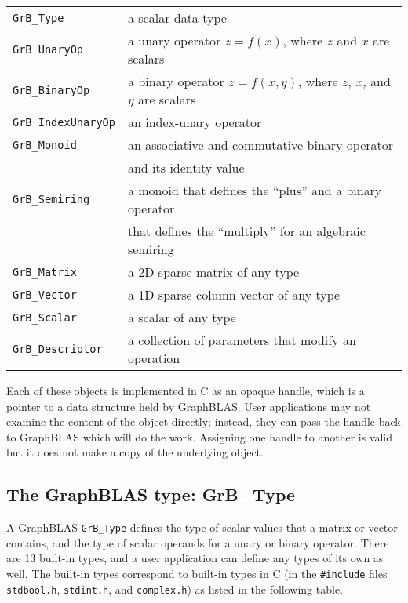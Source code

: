 \documentclass[12pt]{article}
\begin{document}
\vspace{0.1in}
\noindent
{\small
\begin{tabular}{ll}
\hline
\verb'GrB_Type'      & a scalar data type \\
\verb'GrB_UnaryOp'   & a unary operator $z=f(x)$, where $z$ and $x$ are scalars\\
\verb'GrB_BinaryOp'  & a binary operator $z=f(x,y)$, where $z$, $x$, and $y$ are scalars\\
\verb'GrB_IndexUnaryOp'  & an index-unary operator \\
\verb'GrB_Monoid'    & an associative and commutative binary operator  \\
                     & and its identity value \\
\verb'GrB_Semiring'  & a monoid that defines the ``plus'' and a binary operator\\
                     & that defines the ``multiply'' for an algebraic semiring \\
\verb'GrB_Matrix'    & a 2D sparse matrix of any type \\
\verb'GrB_Vector'    & a 1D sparse column vector of any type \\
\verb'GrB_Scalar'    & a scalar of any type \\
\verb'GrB_Descriptor'& a collection of parameters that modify an operation \\
\hline
\end{tabular}
}
\vspace{0.1in}

Each of these objects is implemented in C as an opaque handle, which is a
pointer to a data structure held by GraphBLAS.  User applications may not
examine the content of the object directly; instead, they can pass the handle
back to GraphBLAS which will do the work.  Assigning one handle to another
is valid but it does not make a copy of the underlying object.

\newpage
\subsection{The GraphBLAS type: {\sf GrB\_Type}} %
\label{type}

A GraphBLAS \verb'GrB_Type' defines the type of scalar values that a matrix or
vector contains, and the type of scalar operands for a unary or binary
operator.  There are 13 built-in types, and a user application can define
any types of its own as well.  The built-in types correspond to built-in types
in C (in the \verb'#include' files \verb'stdbool.h', \verb'stdint.h', and
\verb'complex.h') as listed in the following table.
\end{document}
